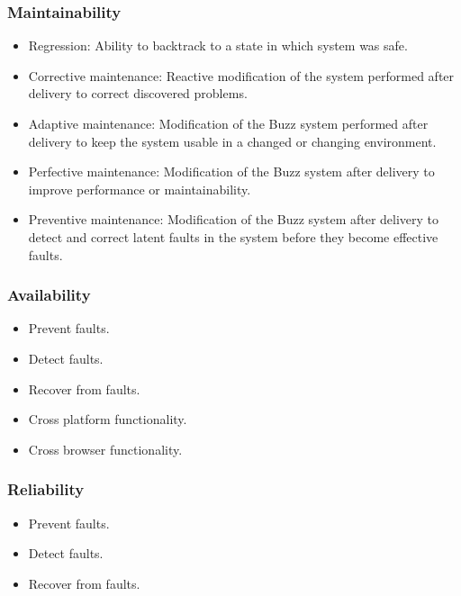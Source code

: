 \documentclass[12pt, oneside]{article}
\begin{document}
		\subsubsection{Maintainability}
			\begin{itemize}
					\item Regression: Ability to backtrack to a state in which system was safe.
					\item Corrective maintenance: Reactive modification of the system performed after delivery to correct discovered problems.
					\item Adaptive maintenance: Modification of the Buzz system performed after delivery to keep the system usable in a changed or changing environment.
					\item Perfective maintenance: Modification of the Buzz system after delivery to improve performance or maintainability.
					\item Preventive maintenance: Modification of the Buzz system after delivery to detect and correct latent faults in the system before they become effective faults.
			\end{itemize}
		\subsubsection{Availability}
		\begin{itemize}
			\item Prevent faults.
			\item Detect faults.
			\item Recover from faults.
			\item Cross platform functionality.
			\item Cross browser functionality.
		\end{itemize}
		
		\subsubsection{Reliability}
		\begin{itemize}
			\item Prevent faults.
			\item Detect faults.
			\item Recover from faults.
		\end{itemize}
	
\end{document}
